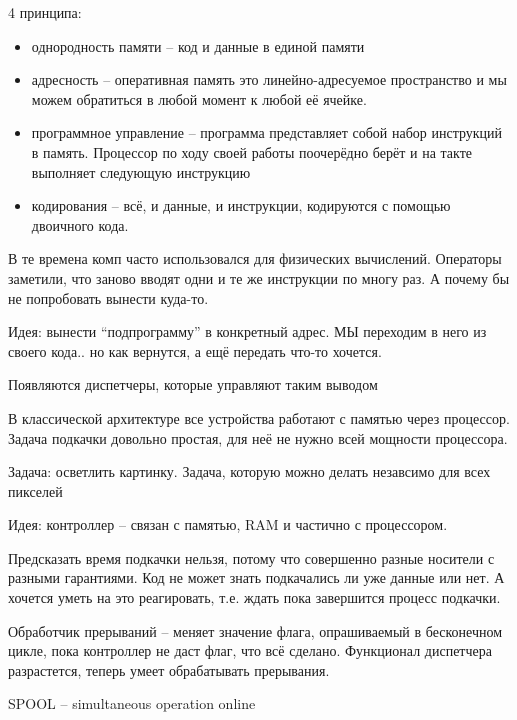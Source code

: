 \documentclass{book}
\theoremstyle{definition}
\begin{document}
    4 принципа:
    \begin{itemize}
        \item однородность памяти -- код и данные в единой памяти
            \item адресность -- оперативная память это линейно-адресуемое пространство и мы можем обратиться в любой момент к любой её ячейке.
            \item программное управление -- программа представляет собой набор инструкций в память. Процессор по ходу своей работы поочерёдно берёт и на такте выполняет следующую инструкцию
            \item кодирования -- всё, и данные, и инструкции, кодируются с помощью двоичного кода.
    \end{itemize}

    \begin{problem}

        В те времена комп часто использовался для физических вычислений. Операторы заметили, что заново вводят одни и те же инструкции по многу раз. А почему бы не попробовать вынести куда-то.

        Идея: вынести ``подпрограмму'' в конкретный адрес. МЫ переходим в него из своего кода.. но как вернутся, а ещё передать что-то хочется.

        Появляются диспетчеры, которые управляют таким выводом
    \end{problem}
    \begin{problem}

        В классической архитектуре все устройства работают с памятью через процессор. Задача подкачки довольно простая, для неё не нужно всей мощности процессора. 

        Задача: осветлить картинку. Задача, которую можно делать незавсимо для всех пикселей

        Идея: контроллер -- связан с памятью, RAM и частично с процессором.

        Предсказать время подкачки нельзя, потому что совершенно разные носители с разными гарантиями. Код не может знать подкачались ли уже данные или нет. А хочется уметь на это реагировать, т.е. ждать пока завершится процесс подкачки.

        Обработчик прерываний -- меняет значение флага, опрашиваемый в бесконечном цикле, пока контроллер не даст флаг, что всё сделано. Функционал диспетчера разрастется, теперь умеет обрабатывать прерывания.

        SPOOL -- simultaneous operation online
    \end{problem}
\end{document}
